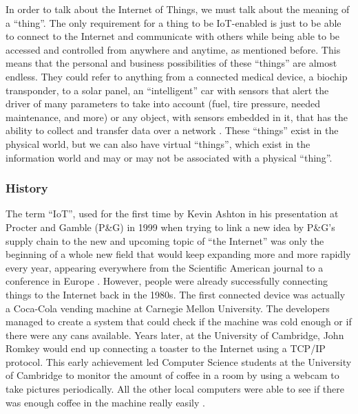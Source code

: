\documentclass[12pt]{article}
\begin{document}
In order to talk about the Internet of Things, we must talk about the meaning of a ``thing''. The only requirement for a thing to be IoT-enabled is just to be able to connect to the Internet and communicate with others while being able to be accessed and controlled from anywhere and anytime, as mentioned before. This means that the personal and business possibilities of these ``things'' are almost endless. They could refer to anything from a connected medical device, a biochip transponder, to a solar panel, an ``intelligent'' car with sensors that alert the driver of many parameters to take into account (fuel, tire pressure, needed maintenance, and more) or any object, with sensors embedded in it, that has the ability to collect and transfer data over a network \cite{aeris}. These ``things'' exist in the physical world, but we can also have virtual ``things'', which exist in the information world and may or may not be associated with a physical ``thing''. 

\subsubsection{History}

The term ``IoT'', used for the first time by Kevin Ashton in his presentation at Procter and Gamble (P\&G) in 1999 when trying to link a new idea by P\&G's supply chain to the new and upcoming topic of ``the Internet'' was only the beginning of a whole new field that would keep expanding more and more rapidly every year, appearing everywhere from the Scientific American journal to a conference in Europe \cite{ashton}. However, people were already successfully connecting things to the Internet back in the 1980s. The first connected device was actually a Coca-Cola vending machine at Carnegie Mellon University. The developers managed to create a system that could check if the machine was cold enough or if there were any cans available. Years later, at the University of Cambridge, John Romkey would end up connecting a toaster to the Internet using a TCP/IP protocol. This early achievement led Computer Science students at the University of Cambridge to monitor the amount of coffee in a room by using a webcam to take pictures periodically. All the other local computers were able to see if there was enough coffee in the machine really easily \cite{itransition}.\par 
\end{document}
